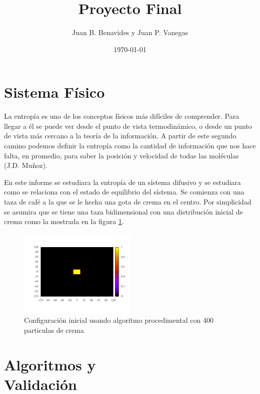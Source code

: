 \documentclass[12pt,twocolumn]{article}
\title{Proyecto Final}
\author{Juan B. Benavides y Juan P. Vanegas }
\date{\today}
\begin{document}
\maketitle

\section{\label{sec: Intro} Sistema Físico}
La entropía es uno de los conceptos físicos más difíciles de comprender. Para llegar a 
él se puede ver desde el punto de vista termodinámico, o desde un punto de vista más 
cercano a la teoría de la información. A partir de este segundo camino podemos definir la 
entropía como la cantidad de información que nos hace falta, en promedio, para saber la posición 
y velocidad de todas las moléculas (J.D. Muñoz). 

En este informe se estudiara la entropía de un sístema difusivo y se estudiara como se relaciona 
con el estado de equilibrio del sístema. Se comienza con una taza de café a la que se le hecha una 
gota de crema en el centro. Por simplicidad se asumira que se tiene una taza bidimensional con una 
distribución inicial de crema como la mostrada en la figura \ref{fig:t0}.

\begin{figure}
    \centering
    \includegraphics[width=0.5\textwidth]{figs/t_0.png}
    \caption{Configuración inicial usando algoritmo procedimental con 400 particulas de crema}
    \label{fig:t0}
\end{figure}

\section{Algoritmos y \\ Validación}
\end{document}
